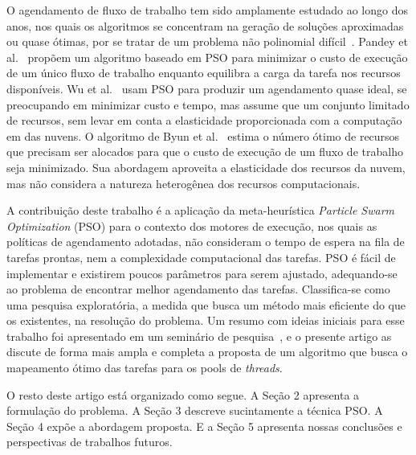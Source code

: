 O agendamento de fluxo de trabalho tem sido amplamente estudado ao longo dos anos, nos quais os algoritmos se concentram na geração de soluções aproximadas ou quase ótimas, por se tratar de um problema não polinomial difícil~\cite{sousa2004}. Pandey et al.~\cite{pandey2010} propõem um algoritmo baseado em PSO para minimizar o custo de execução de um único fluxo de trabalho enquanto equilibra a carga da tarefa nos recursos disponíveis. Wu et al.~\cite{wu2010} usam PSO para produzir um agendamento quase ideal, se preocupando em minimizar custo e tempo, mas assume que um conjunto limitado de recursos, sem levar em conta a elasticidade proporcionada com a computação em das nuvens. O algoritmo de Byun et al.~\cite{byun2011} estima o número ótimo de recursos que precisam ser alocados para que o custo de execução de um fluxo de trabalho seja minimizado. Sua abordagem aproveita a elasticidade dos recursos da nuvem, mas não considera a natureza heterogênea dos recursos computacionais.

A contribuição deste trabalho é a aplicação da meta-heurística \textit{Particle Swarm Optimization} (PSO) para o contexto dos motores de execução, nos quais as políticas de agendamento adotadas, não consideram o tempo de espera na fila de tarefas prontas, nem a complexidade computacional das tarefas. PSO é fácil de implementar e existirem poucos parâmetros para serem ajustado, adequando-se ao problema de encontrar melhor agendamento das tarefas. Classifica-se como uma pesquisa exploratória, a medida que busca um método mais eficiente do que os existentes, na resolução do problema. Um resumo com ideias iniciais para esse trabalho foi apresentado em um seminário de pesquisa~\cite{sellaro2017}, e o presente artigo as discute de forma mais ampla e completa  a proposta de um algoritmo que busca o mapeamento ótimo das tarefas para os pools de \emph{threads}.

O resto deste artigo está organizado como segue. A Seção 2 apresenta a formulação do problema. A Seção 3 descreve sucintamente a técnica PSO. A Seção 4 expõe a abordagem proposta. E a Seção 5 apresenta nossas conclusões e perspectivas de trabalhos futuros. 